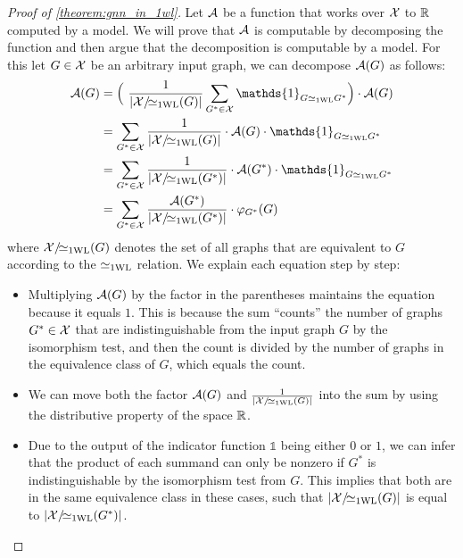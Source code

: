 \begin{proof}[Proof of \cref{theorem:gnn_in_1wl}]\label{prof:gnn_in_1wl}
    Let $\mathcal{A}$ be a function that works over $\mathcal{X}$ to $\mathbb{R}$ computed by a \gnn model. We will prove that $\mathcal{A}$ is \wlnn computable by decomposing the function and then argue that the decomposition is computable by a \wlnn model. For this let $G \in \mathcal{X}$ be an arbitrary input graph, we can decompose $\mathcal{A}(G)$ as follows:
    \begin{align}
        \cA(G) &= \Bigl( \ \frac{1}{|\cX/\!{\wliso}(G)|}\sum_{G^* \in \cX} \mathds{1}_{G \wliso G^*} \Bigr) \cdot \cA(G) \label{eq:gnn_decomposition1}\\
        &= \sum_{G^* \in \cX} \frac{1}{|\cX/\!{\wliso}(G)|} \cdot \cA(G) \cdot \mathds{1}_{G \wliso G^*} \label{eq:gnn_decomposition2}\\
        &= \sum_{G^* \in \cX} \frac{1}{|\cX/\!{\wliso}(G^*)|} \cdot \cA(G^*) \cdot \mathds{1}_{G \wliso G^*} \label{eq:gnn_decomposition3}\\
        &= \sum_{G^* \in \cX} \frac{\cA(G^*)}{|\cX/\!{\wliso}(G^*)|}  \cdot \varphi_{G^*}(G) \label{eq:gnn_decomposition4}
    \end{align}
    where $\mathcal{X}/\!{\simeq_{\text{1WL}}}(G)$ denotes the set of all graphs that are equivalent to $G$ according to the $\simeq_{\text{1WL}}$ relation. We explain each equation step by step:
    \begin{itemize}[leftmargin=9em]
        \item[\cref*{eq:gnn_decomposition1}:] Multiplying $\mathcal{A}(G)$ by the factor in the parentheses maintains the equation because it equals $1$. This is because the sum ``counts'' the number of graphs $G^* \in \mathcal{X}$ that are indistinguishable from the input graph $G$ by the \wl isomorphism test, and then the count is divided by the number of graphs in the equivalence class of $G$, which equals the count.
        \item[\cref*{eq:gnn_decomposition2}:] We can move both the factor $\mathcal{A}(G)$ and $\frac{1}{|\mathcal{X}/\!{\simeq_{\text{1WL}}}(G)|}$ into the sum by using the distributive property of the space $\mathbb{R}$.     
        \item[\cref*{eq:gnn_decomposition3}:] Due to the output of the indicator function $\mathds{1}$ being either $0$ or $1$, we can infer that the product of each summand can only be nonzero if $G^*$ is indistinguishable by the \wl isomorphism test from $G$. This implies that both are in the same equivalence class in these cases, such that $|\mathcal{X}/\!{\simeq_{\text{1WL}}}(G)|$ is equal to $|\mathcal{X}/\!{\simeq_{\text{1WL}}}(G^*)|$.\\

\end{itemize}
\end{proof}
